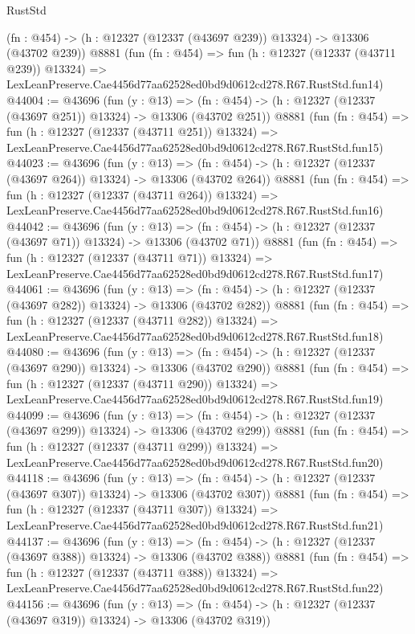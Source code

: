\begin{lexlean}{RustStd}
\begin{coremodule}
    (fn : @454) -> (h : @12327 (@12337 (@43697 @239)) @13324) -> @13306 (@43702 @239))
    @8881
    (fun (fn : @454) =>
    fun (h : @12327 (@12337 (@43711 @239)) @13324) =>
    LexLeanPreserve.Cae4456d77aa62528ed0bd9d0612cd278.R67.RustStd.fun14)
@44004 := @43696
    (fun (y : @13) =>
    (fn : @454) -> (h : @12327 (@12337 (@43697 @251)) @13324) -> @13306 (@43702 @251))
    @8881
    (fun (fn : @454) =>
    fun (h : @12327 (@12337 (@43711 @251)) @13324) =>
    LexLeanPreserve.Cae4456d77aa62528ed0bd9d0612cd278.R67.RustStd.fun15)
@44023 := @43696
    (fun (y : @13) =>
    (fn : @454) -> (h : @12327 (@12337 (@43697 @264)) @13324) -> @13306 (@43702 @264))
    @8881
    (fun (fn : @454) =>
    fun (h : @12327 (@12337 (@43711 @264)) @13324) =>
    LexLeanPreserve.Cae4456d77aa62528ed0bd9d0612cd278.R67.RustStd.fun16)
@44042 := @43696
    (fun (y : @13) =>
    (fn : @454) -> (h : @12327 (@12337 (@43697 @71)) @13324) -> @13306 (@43702 @71))
    @8881
    (fun (fn : @454) =>
    fun (h : @12327 (@12337 (@43711 @71)) @13324) =>
    LexLeanPreserve.Cae4456d77aa62528ed0bd9d0612cd278.R67.RustStd.fun17)
@44061 := @43696
    (fun (y : @13) =>
    (fn : @454) -> (h : @12327 (@12337 (@43697 @282)) @13324) -> @13306 (@43702 @282))
    @8881
    (fun (fn : @454) =>
    fun (h : @12327 (@12337 (@43711 @282)) @13324) =>
    LexLeanPreserve.Cae4456d77aa62528ed0bd9d0612cd278.R67.RustStd.fun18)
@44080 := @43696
    (fun (y : @13) =>
    (fn : @454) -> (h : @12327 (@12337 (@43697 @290)) @13324) -> @13306 (@43702 @290))
    @8881
    (fun (fn : @454) =>
    fun (h : @12327 (@12337 (@43711 @290)) @13324) =>
    LexLeanPreserve.Cae4456d77aa62528ed0bd9d0612cd278.R67.RustStd.fun19)
@44099 := @43696
    (fun (y : @13) =>
    (fn : @454) -> (h : @12327 (@12337 (@43697 @299)) @13324) -> @13306 (@43702 @299))
    @8881
    (fun (fn : @454) =>
    fun (h : @12327 (@12337 (@43711 @299)) @13324) =>
    LexLeanPreserve.Cae4456d77aa62528ed0bd9d0612cd278.R67.RustStd.fun20)
@44118 := @43696
    (fun (y : @13) =>
    (fn : @454) -> (h : @12327 (@12337 (@43697 @307)) @13324) -> @13306 (@43702 @307))
    @8881
    (fun (fn : @454) =>
    fun (h : @12327 (@12337 (@43711 @307)) @13324) =>
    LexLeanPreserve.Cae4456d77aa62528ed0bd9d0612cd278.R67.RustStd.fun21)
@44137 := @43696
    (fun (y : @13) =>
    (fn : @454) -> (h : @12327 (@12337 (@43697 @388)) @13324) -> @13306 (@43702 @388))
    @8881
    (fun (fn : @454) =>
    fun (h : @12327 (@12337 (@43711 @388)) @13324) =>
    LexLeanPreserve.Cae4456d77aa62528ed0bd9d0612cd278.R67.RustStd.fun22)
@44156 := @43696
    (fun (y : @13) =>
    (fn : @454) -> (h : @12327 (@12337 (@43697 @319)) @13324) -> @13306 (@43702 @319))

\end{coremodule}
\end{lexlean}
